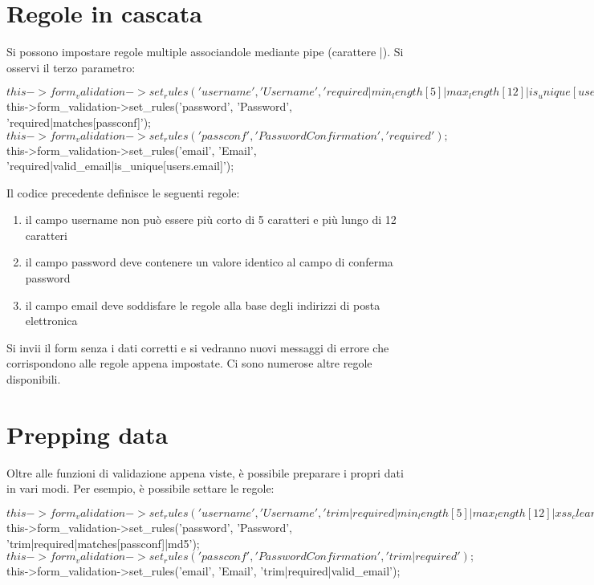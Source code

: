 \section*{Regole in cascata}
Si possono impostare regole multiple associandole mediante pipe (carattere |). Si osservi il terzo parametro:

\begin{code}
$this->form_validation->set_rules('username', 'Username', 'required|min_length[5]|max_length[12]|is_unique[users.username]');
$this->form_validation->set_rules('password', 'Password', 'required|matches[passconf]');
$this->form_validation->set_rules('passconf', 'Password Confirmation', 'required');
$this->form_validation->set_rules('email', 'Email', 'required|valid_email|is_unique[users.email]');
\end{code}

Il codice precedente definisce le seguenti regole:

\begin{enumerate}
\item il campo username non può essere più corto di 5 caratteri e più lungo di 12 caratteri
\item il campo password deve contenere un valore identico al campo di conferma password
\item il campo email deve soddisfare le regole alla base degli indirizzi di posta elettronica
\end{enumerate}

Si invii il form senza i dati corretti e si vedranno nuovi messaggi di errore che corrispondono alle regole appena impostate. Ci sono numerose altre regole disponibili.

\section*{Prepping data}
Oltre alle funzioni di validazione appena viste, è possibile preparare i propri dati in vari modi. Per esempio, è possibile settare le regole:

\begin{code}
$this->form_validation->set_rules('username', 'Username', 'trim|required|min_length[5]|max_length[12]|xss_clean');
$this->form_validation->set_rules('password', 'Password', 'trim|required|matches[passconf]|md5');
$this->form_validation->set_rules('passconf', 'Password Confirmation', 'trim|required');
$this->form_validation->set_rules('email', 'Email', 'trim|required|valid_email');
\end{code}

